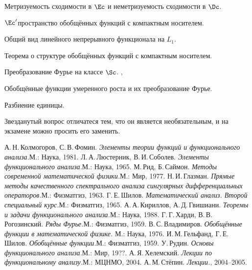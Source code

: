 \documentclass[a4paper]{article}
\begin{document}
\begin{nums}{-3}
\item Метризуемость сходимости в $\Ec$ и неметризуемость сходимости в $\Dc$. \cite{lec}
\item $\Ec'$\т пространство обобщённых функций с компактным носителем. \cite{lec}
\item Общий вид линейного непрерывного функционала на $L_1$. \cite{lec}
\item Теорема о структуре обобщённых функций с компактным носителем. \cite[6]{ru}
\item Преобразование Фурье на классе $\Sc$. \cite[7.3]{h}, \cite[IV.2.3]{kg}
\item Обобщённые функции умеренного роста и их преобразование Фурье.
\item Разбиение единицы.
\end{nums}

\begin{note}
Звезданутый вопрос отличатеся тем, что он является необязательным, и на экзамене можно просить его заменить.
\end{note}

\begin{thebibliography}{ГШ}
\setlength\itemsep{-2pt}
    А.\,Н.\,Колмогоров, С.\,В.\,Фомин. \emph{Элементы теории функций и функционального анализа.}\т М.: Наука, 1981.
    Л.\,А.\,Люстерник, В.\,И.\,Соболев. \emph{Элементы функционального анализа.}\т М.: Наука, 1965.
    М.\,Рид, Б.\,Саймон. \emph{Методы современной математической физики.}\т М.: Мир, 1977.
    Н.\,И.\,Глазман. \emph{Прямые методы качественного спектрального анализа сингулярных
    дифференциальных операторов.}\т М.: Физматгиз, 1963.
    Г.\,Е.\,Шилов. \emph{Математический анализ. Второй специальный курс.}\т М.: Физматгиз, 1965.
    А.\,А.\,Кириллов, А.\,Д.\,Гвишиани. \emph{Теоремы и задачи функционального анализа.}\т М.: Наука, 1988.
    Г.\,Г.\,Харди, В.\,В.\,Рогозинский. \emph{Ряды Фурье.}\т М.: Физматгиз, 1959.
    В.\,С.\,Владимиров. \emph{Обобщённые функции в математической физике.} М.: Наука, 1976.
    И.\,М.\,Гельфанд, Г.\,Е.\,Шилов. \emph{Обобщённые функции.}\т М.: Физматгиз, 1959.
    У.\,Рудин. \emph{Основы функционального анализа.}\т М.: Мир, 19??.
    А.\,Я.\,Хелемский. \emph{Лекции по функциональному анализу.}\т М.: МЦНМО, 2004.
    А.\,М.\,Стёпин. \emph{Лекции.}\т \dmvnwebsite, 2004--2005.
\end{thebibliography}

\medskip\dmvntrail
\end{document}
